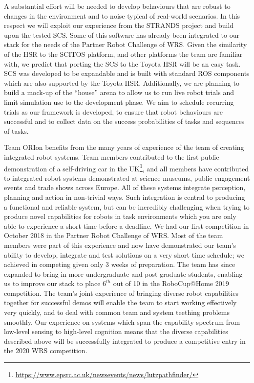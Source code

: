 \documentclass[runningheads,a4paper]{llncs}
\newcommand{\teamori}{Team ORIon}
\begin{document}
A substantial effort will be needed to develop behaviours that are robust to
changes in the environment and to noise typical of real-world scenarios. In this
respect we will exploit our experience from the STRANDS project 
\cite{strands@ram} and build upon the tested SCS. Some of this software has already been integrated to our stack for the needs of the Partner Robot Challenge of WRS.
Given the similarity of the HSR to the SCITOS platform, and other platforms the team are familiar with, %
we predict that porting the
SCS to the Toyota HSR will be an easy task. SCS was developed to be 
expandable and is built with standard ROS components which are also supported 
by the Toyota HSR. 
Additionally, we are planning to build a mock-up of the ``house'' arena to
allow us to run live robot trials and limit simulation use to the development
phase. We aim to schedule recurring trials as our framework is developed, to
ensure that robot behaviours are successful and to collect data on the 
success probabilities of tasks and sequences of tasks.

\teamori{} benefits from the many years of experience of the team of creating integrated robot systems. Team members contributed to the first public demonstration of a self-driving car in the UK\footnote{\url{https://www.epsrc.ac.uk/newsevents/news/lutzpathfinder/}}, and all members have contributed to integrated robot systems demonstrated at science museums, public engagement events and trade shows across Europe. All of these systems integrate perception, planning and action in non-trivial ways. Such integration is central to producing a functional and reliable system, but can be incredibly challenging when trying to produce novel capabilities for robots in task environments which you are only able to experience a short time before a deadline. We had our
first competition in October 2018 in the Partner Robot Challenge of WRS. 
Most of the team members were part of this experience and now have demonstrated
our team's ability to develop, integrate and test solutions on a very short
time schedule; we achieved in competing given only 3 weeks of preparation. The team has since expanded to bring in more undergraduate and post-graduate students, enabling us to improve our stack to place $6^{th}$ out of 10 in the RoboCup@Home 2019 competition.
The team's joint experience of bringing diverse robot capabilities together for successful demos will enable the team to start working effectively very quickly, and to deal with common team and system teething problems smoothly. Our experience on systems which span the capability spectrum from low-level sensing to high-level cognition means that the diverse capabilities described above will be successfully integrated to produce a competitive entry in the 2020 WRS competition.
\end{document}
